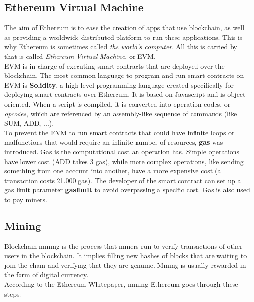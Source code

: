 \documentclass[10pt]{article}
\begin{document}
\begin{multicols}{2}
\subsection{Ethereum Virtual Machine}

The aim of Ethereum is to ease the creation of apps that use blockchain, as well as providing a worldwide-distributed platform to run these applications. This is why Ethereum is sometimes called \textit{the world's computer}. All this is carried by that is called \textit{Ethereum Virtual Machine}, or EVM.\\

EVM is in charge of executing smart contracts that are deployed over the blockchain. The most common language to program and run smart contracts on EVM is \textbf{Solidity}, a high-level programming language created specifically for deploying smart contracts over Ethereum. It is based on Javascript and is object-oriented. When a script is compiled, it is converted into operation codes, or \textit{opcodes}, which are referenced by an assembly-like sequence of commands (like SUM, ADD, ...).\\

To prevent the EVM to run smart contracts that could have infinite loops or malfunctions that would require an infinite number of resources, \textbf{gas} was introduced. Gas is the computational cost an operation has. Simple operations have lower cost (ADD takes 3 gas), while more complex operations, like sending something from one account into another, have a more expensive cost (a transaction costs 21.000 gas). The developer of the smart contract can set up a gas limit parameter \textbf{gaslimit} to avoid overpassing a specific cost. Gas is also used to pay miners.\\

\subsection{Mining}

Blockchain mining is the process that miners run to verify transactions of other users in the blockchain. It implies filling new hashes of blocks that are waiting to join the chain and verifying that they are genuine. Mining is usually rewarded in the form of digital currency.\\

According to the Ethereum Whitepaper\cite{ref:buterin}, mining Ethereum goes through these steps:


\end{multicols}
\end{document}

